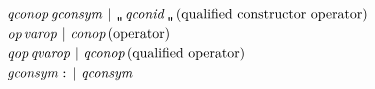 \begin{flushleft}
\begin{tabbing}
$\it \indexsyn{qconop}qconop$\>\makebox[3.5em]{$\rightarrow$}$\it gconsym\ |\ \bkqB\ qconid\ \bkqA$\>\makebox[3em]{}$\it (\tr{qualified\ constructor\ operator})$\\ 
$\it \indexsyn{op}op$\>\makebox[3.5em]{$\rightarrow$}$\it varop\ |\ conop$\>\makebox[3em]{}$\it (\mbox{{\rm operator}})$\\ 
$\it \indexsyn{qop}qop$\>\makebox[3.5em]{$\rightarrow$}$\it qvarop\ |\ qconop$\>\makebox[3em]{}$\it (\mbox{{\rm qualified\ operator}})$\\ 
$\it \indexsyn{gconsym}gconsym$\>\makebox[3.5em]{$\rightarrow$}$\it \makebox{\tt :}\ |\ qconsym$
\end{tabbing}\end{flushleft}


